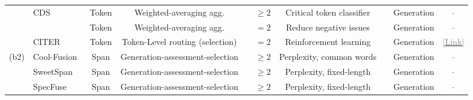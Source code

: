 \documentclass{article}
\newcommand{\cmark}{\ding{51}}%
\newcommand{\xmark}{\ding{55}}%
\begin{document}
\begin{table}[t]
{\begin{threeparttable}
{\begin{tabular}{llcc c c c c c c }
&
CDS~\cite{jin2024collaborative} &Token  &Weighted-averaging agg.   &\xmark  & $\geq2$ &  Critical token classifier&\xmark   & Generation &  \textcolor{gray}{-}\\

&
\cellcolor[rgb]{ .867, .922, .969}\cite{li2024purifying} &\cellcolor[rgb]{ .867, .922, .969}Token  &\cellcolor[rgb]{ .867, .922, .969}Weighted-averaging agg.   &\cellcolor[rgb]{ .867, .922, .969}\cmark  & \cellcolor[rgb]{ .867, .922, .969}$=2$ &  \cellcolor[rgb]{ .867, .922, .969}Reduce negative issues  &\cellcolor[rgb]{ .867, .922, .969}\xmark   & \cellcolor[rgb]{ .867, .922, .969}Generation &  \cellcolor[rgb]{ .867, .922, .969}\textcolor{gray}{-}\\

&
CITER~\cite{zheng2025citer} & Token &Token-Level routing (selection)   &\xmark  &$= 2$ &Reinforcement learning  &\cmark  & Generation& \href{https://github.com/aiming-lab/CITER}{\textcolor{gray}{[Link]}}\\

\cmidrule{2-10} 

\multirow{3}{*}{(b2)}
& 
\cellcolor[rgb]{ .867, .922, .969}Cool-Fusion~\cite{liu2024cool} &\cellcolor[rgb]{ .867, .922, .969}Span  & \cellcolor[rgb]{ .867, .922, .969}Generation-assessment-selection  & \cellcolor[rgb]{ .867, .922, .969}\cmark & \cellcolor[rgb]{ .867, .922, .969}$\geq 2$ &\cellcolor[rgb]{ .867, .922, .969}Perplexity, common words &\cellcolor[rgb]{ .867, .922, .969}\xmark  &\cellcolor[rgb]{ .867, .922, .969}Generation & \cellcolor[rgb]{ .867, .922, .969}\textcolor{gray}{-}\\
&
SweetSpan~\cite{xu2025hit}  & Span  &   Generation-assessment-selection &  \cmark &  $\geq 2$ &  Perplexity, fixed-length &  \xmark  & Generation &  \textcolor{gray}{-}\\
&
\cellcolor[rgb]{ .867, .922, .969}SpecFuse~\cite{lv2024specfuse}  &\cellcolor[rgb]{ .867, .922, .969}Span  &\cellcolor[rgb]{ .867, .922, .969}Generation-assessment-selection   & \cellcolor[rgb]{ .867, .922, .969}\cmark & \cellcolor[rgb]{ .867, .922, .969}$\geq 2$ & \cellcolor[rgb]{ .867, .922, .969}Perplexity, fixed-length & \cellcolor[rgb]{ .867, .922, .969}\cmark &\cellcolor[rgb]{ .867, .922, .969}Generation & \cellcolor[rgb]{ .867, .922, .969}\textcolor{gray}{-}\\


\end{tabular}}
\end{threeparttable}}
\end{table}
\end{document}

